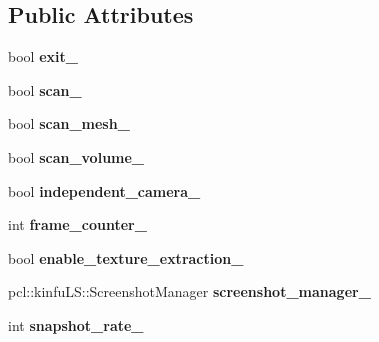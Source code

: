 \subsection*{Public Attributes}
\begin{DoxyCompactItemize}
\item 
\hypertarget{struct_kin_fu_l_s_app_a1c5769a12e06dc3912d6584523bd71d0}{bool {\bfseries exit\+\_\+}}\label{struct_kin_fu_l_s_app_a1c5769a12e06dc3912d6584523bd71d0}

\item 
\hypertarget{struct_kin_fu_l_s_app_aba97d2165d7108bde30af7e5805bd6bd}{bool {\bfseries scan\+\_\+}}\label{struct_kin_fu_l_s_app_aba97d2165d7108bde30af7e5805bd6bd}

\item 
\hypertarget{struct_kin_fu_l_s_app_a62ee9b37fa531f4839ecdf64310cd4d0}{bool {\bfseries scan\+\_\+mesh\+\_\+}}\label{struct_kin_fu_l_s_app_a62ee9b37fa531f4839ecdf64310cd4d0}

\item 
\hypertarget{struct_kin_fu_l_s_app_ab2716c9664a729f6802c379ef085d5b7}{bool {\bfseries scan\+\_\+volume\+\_\+}}\label{struct_kin_fu_l_s_app_ab2716c9664a729f6802c379ef085d5b7}

\item 
\hypertarget{struct_kin_fu_l_s_app_adff42afe85cd544473eb19153d5b9b61}{bool {\bfseries independent\+\_\+camera\+\_\+}}\label{struct_kin_fu_l_s_app_adff42afe85cd544473eb19153d5b9b61}

\item 
\hypertarget{struct_kin_fu_l_s_app_a1dcc90b89fc50705c8289d204205b2d7}{int {\bfseries frame\+\_\+counter\+\_\+}}\label{struct_kin_fu_l_s_app_a1dcc90b89fc50705c8289d204205b2d7}

\item 
\hypertarget{struct_kin_fu_l_s_app_aaf183373085a0f83145b45cacf0b26f0}{bool {\bfseries enable\+\_\+texture\+\_\+extraction\+\_\+}}\label{struct_kin_fu_l_s_app_aaf183373085a0f83145b45cacf0b26f0}

\item 
\hypertarget{struct_kin_fu_l_s_app_a539b7cb75153a3e53dd2a25f1756b900}{pcl\+::kinfu\+L\+S\+::\+Screenshot\+Manager {\bfseries screenshot\+\_\+manager\+\_\+}}\label{struct_kin_fu_l_s_app_a539b7cb75153a3e53dd2a25f1756b900}

\item 
\hypertarget{struct_kin_fu_l_s_app_a8a95aa8eda0d5bd23bb3557e39948600}{int {\bfseries snapshot\+\_\+rate\+\_\+}}\label{struct_kin_fu_l_s_app_a8a95aa8eda0d5bd23bb3557e39948600}


\end{DoxyCompactItemize}
